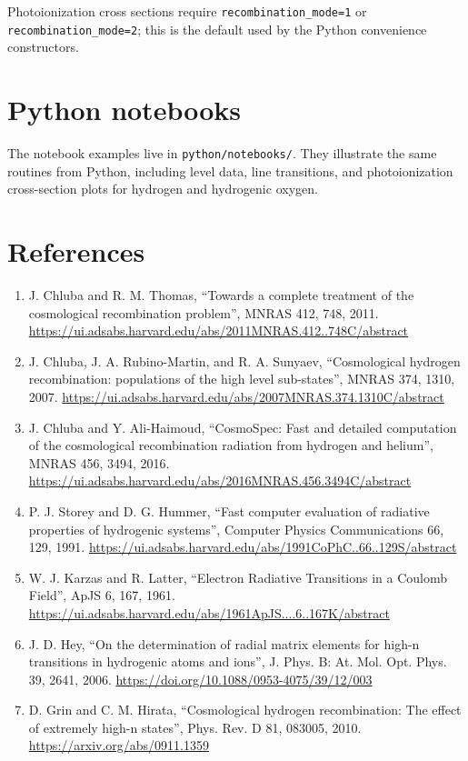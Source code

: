 \documentclass[11pt]{article}
\begin{document}
Photoionization cross sections require \texttt{recombination\_mode=1} or \texttt{recombination\_mode=2}; this is the default used by the Python convenience constructors.

\section{Python notebooks}

The notebook examples live in \texttt{python/notebooks/}. They illustrate the same routines from Python, including level data, line transitions, and photoionization cross-section plots for hydrogen and hydrogenic oxygen.

\section{References}

\begin{enumerate}
\item J. Chluba and R. M. Thomas, ``Towards a complete treatment of the cosmological recombination problem'', MNRAS 412, 748, 2011. \url{https://ui.adsabs.harvard.edu/abs/2011MNRAS.412..748C/abstract}
\item J. Chluba, J. A. Rubino-Martin, and R. A. Sunyaev, ``Cosmological hydrogen recombination: populations of the high level sub-states'', MNRAS 374, 1310, 2007. \url{https://ui.adsabs.harvard.edu/abs/2007MNRAS.374.1310C/abstract}
\item J. Chluba and Y. Ali-Haimoud, ``CosmoSpec: Fast and detailed computation of the cosmological recombination radiation from hydrogen and helium'', MNRAS 456, 3494, 2016. \url{https://ui.adsabs.harvard.edu/abs/2016MNRAS.456.3494C/abstract}
\item P. J. Storey and D. G. Hummer, ``Fast computer evaluation of radiative properties of hydrogenic systems'', Computer Physics Communications 66, 129, 1991. \url{https://ui.adsabs.harvard.edu/abs/1991CoPhC..66..129S/abstract}
\item W. J. Karzas and R. Latter, ``Electron Radiative Transitions in a Coulomb Field'', ApJS 6, 167, 1961. \url{https://ui.adsabs.harvard.edu/abs/1961ApJS....6..167K/abstract}
\item J. D. Hey, ``On the determination of radial matrix elements for high-n transitions in hydrogenic atoms and ions'', J. Phys. B: At. Mol. Opt. Phys. 39, 2641, 2006. \url{https://doi.org/10.1088/0953-4075/39/12/003}
\item D. Grin and C. M. Hirata, ``Cosmological hydrogen recombination: The effect of extremely high-n states'', Phys. Rev. D 81, 083005, 2010. \url{https://arxiv.org/abs/0911.1359}
\end{enumerate}
\end{document}
